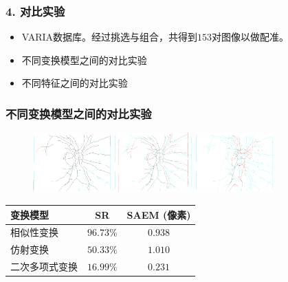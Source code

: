 \documentclass[notheorems,mathserif,table,compress]{beamer}  %
\begin{document}
\begin{frame}
\frametitle{4. 对比实验}
\begin{itemize}
\item VARIA数据库。经过挑选与组合，共得到$153$对图像以做配准。
\vspace{2mm}
\item 不同变换模型之间的对比实验
\vspace{2mm}
\item 不同特征之间的对比实验
\end{itemize}
\end{frame}

\begin{frame}
\frametitle{不同变换模型之间的对比实验}
\begin{figure}
\centering
\begin{minipage}[b]{0.3\textwidth} 
      \centering 
      \includegraphics[width=3cm]{chap03/similarity1.png}
\end{minipage}
\begin{minipage}[b]{0.3\textwidth}
    \centering
    \includegraphics[width=3cm]{chap03/affine1.png}
  \end{minipage}
\begin{minipage}[b]{0.3\textwidth}
	\centering
      \includegraphics[width=3cm]{chap03/polynomial1.png}
    \end{minipage}
\caption*{\color{blue}{相似性变换、仿射变换、二次多项式变换}}
\end{figure}
\begin{table}
\centering
\begin{tabular}{lcc}
\toprule
变换模型 & SR  & SAEM (像素)\\
\midrule
相似性变换 & $\mathbf{96.73\%}$ & $\mathbf{0.938}$ \\
仿射变换 & $50.33\%$ & $1.010$              \\
二次多项式变换 & $16.99\%$ & $0.231$\\
\bottomrule
\end{tabular}
\label{tab:models}
\end{table}
\end{frame}
\end{document}
